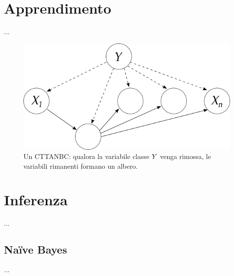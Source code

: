 
\section{Apprendimento}\label{sec:learning-ctbnc}
...


\begin{figure}
\centering
\includegraphics[width=0.9\columnwidth]{immagini/cttanb}
\caption[Un \acs{CTTANBC}]{Un \acl{CTTANBC}: qualora la variabile classe $\mathnormal{Y}$ venga rimossa, le variabili rimanenti formano un albero.}
\label{fig:cttanb}
\end{figure}

\section{Inferenza}\label{sec:inference-ctbnc}
...

\subsection{Na\"ive Bayes}\label{sec:inference-ctnb}
...

